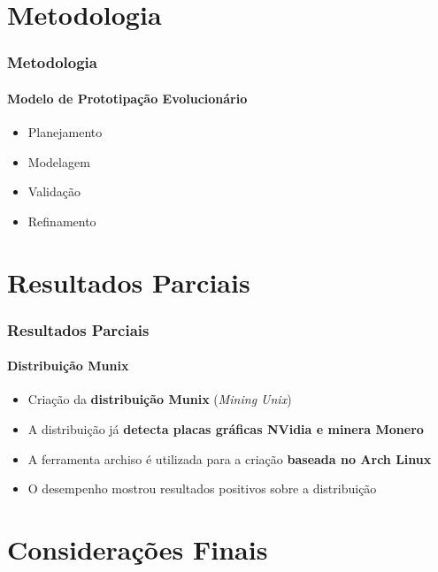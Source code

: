 \documentclass[aspectratio=43]{beamer}
\begin{document}
\section{Metodologia}
\begin{frame}
    \frametitle{Metodologia}
    \framesubtitle{Modelo de Prototipação Evolucionário}

    \begin{itemize}
        \item Planejamento

        \item Modelagem

        \item Validação

        \item Refinamento

    \end{itemize}
\end{frame}

\section{Resultados Parciais}

\begin{frame}
    \frametitle{Resultados Parciais}
    \framesubtitle{Distribuição Munix}

    \begin{itemize}
        \item Criação da \textbf{distribuição Munix} (\emph{Mining Unix}) 

        \item A distribuição já \textbf{detecta placas gráficas NVidia e
            minera Monero}

        \item A ferramenta archiso é utilizada para a criação
            \textbf{baseada no Arch Linux}

        \item O desempenho mostrou resultados positivos sobre a
            distribuição

    \end{itemize}
\end{frame}


\section{Considerações Finais}
\end{document}
